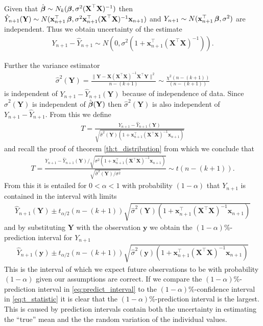 Given that $\hat{\operatorname{\boldsymbol{\beta}}} \sim N_k(\operatorname{\boldsymbol{\beta}},\sigma^2(\textbf{X}^\top\textbf{X})^{-1})$ then $\hat{Y}_{n+1}(\textbf{Y})\sim N(\textbf{x}^\top_{n+1}\operatorname{\boldsymbol{\beta}},\sigma^2\textbf{x}^\top_{n+1}(\textbf{X}^\top\textbf{X})^{-1}\textbf{x}_{n+1})$ and $Y_{n+1}\sim N(\textbf{x}^\top_{n+1}\operatorname{\boldsymbol{\beta}},\sigma^2)$ are independent. Thus we obtain uncertainty of the estimate
\begin{align*}
    Y_{n+1}-\hat{Y}_{n+1} \sim N(0, \sigma^2(1+\textbf{x}^\top_{n+1}(\textbf{X}^\top\textbf{X})^{-1})).
\end{align*}

Further the variance estimator
\begin{align*}
    \hat{\sigma}^2(\textbf{Y})=\frac{\|\textbf{Y} - \textbf{X}( \textbf{X}^\top\textbf{X} )^{-1}\textbf{X}^\top\textbf{Y}\|^2}{n-(k+1)} \sim \frac{\chi^2(n-(k+1))}{(n-(k+1))}
\end{align*}
is independent of $Y_{n+1}-\hat{Y}_{n+1}(\textbf{Y})$ because of independence of data. Since $\hat{\sigma}^2(\textbf{Y})$ is independent of $\hat{\operatorname{\boldsymbol{\beta}}}(\textbf{Y})$ then $\hat{\sigma}^2(\textbf{Y})$ is also independent of $Y_{n+1}-\hat{Y}_{n+1}$. From this we define
\begin{align*}
    T=\frac{Y_{n+1}-\hat{Y}_{n+1}(\textbf{Y})}{\sqrt{\hat{\sigma}^2(\textbf{Y})(1+\textbf{x}^\top_{n+1}(\textbf{X}^\top\textbf{X})^{-1}\textbf{x}_{n+1})}}
\end{align*}
and recall the proof of theorem \ref{th:t_distribution} from which we conclude that
\begin{align*}
    T=\frac{Y_{n+1}-\hat{Y}_{n+1}(\textbf{Y})/\sqrt{\sigma^2(1+\textbf{x}^\top_{n+1}(\textbf{X}^\top\textbf{X})^{-1}\textbf{x}_{n+1})}}{\sqrt{\hat{\sigma}^2(\textbf{Y})/\sigma^2}} \sim t(n-(k+1)).
\end{align*}
From this it is entailed for $0<\alpha<1$ with probability $(1-\alpha)$ that $Y_{n+1}$ is contained in the interval with limits
\begin{align*}
    \hat{Y}_{n+1}(\textbf{Y})\pm t_{\alpha/2}(n-(k+1))\sqrt{\hat{\sigma}^2(\textbf{Y})(1+\textbf{x}^\top_{n+1}(\textbf{X}^\top\textbf{X})^{-1}\textbf{x}_{n+1})}
\end{align*}
and by substituting $\textbf{Y}$ with the observation $\textbf{y}$ we obtain the $(1-\alpha)\%$-prediction interval for $Y_{n+1}$
\begin{align} \label{eq:predict_interval}
    \hat{Y}_{n+1}(\textbf{y})\pm t_{\alpha/2}(n-(k+1))\sqrt{\hat{\sigma}^2(\textbf{y})(1+\textbf{x}^\top_{n+1}(\textbf{X}^\top\textbf{X})^{-1}\textbf{x}_{n+1})}
\end{align}
This is the interval of which we expect future observations to be with probability $(1-\alpha)$ given our assumptions are correct.
If we compare the $(1-\alpha)\%$-prediction interval in \eqref{eq:predict_interval} to the $(1-\alpha)\%$-confidence interval in \eqref{eq:t_statistic} it is clear that the $(1-\alpha)\%$-prediction interval is the largest.
This is caused by prediction intervals contain both the uncertainty in estimating the ``true'' mean and the the random variation of the individual values.

